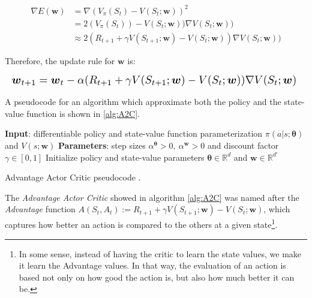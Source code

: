 \documentclass[twoside,twocolumn]{article}
\begin{document}
\begin{equation*}
  \begin{split}
    \nabla E(\boldsymbol{w}) &= \nabla (V_{\pi}(S_t) - V(S_t;\boldsymbol{w}))^2 \\
    &= 2(V_{\pi}(S_t)) - V(S_t;\boldsymbol{w})) \nabla V(S_t;\boldsymbol{w})) \\
    &\approx 2(R_{t+1} + \gamma V(S_{t+1};\boldsymbol{w}) - V(S_t;\boldsymbol{w})) \nabla V(S_t;\boldsymbol{w}))
  \end{split}
\end{equation*}

Therefore, the update rule for $\boldsymbol{w}$ is:

\begin{equation*}
  \resizebox{1\linewidth}{!}{%
  $
    \boldsymbol{w}_{t+1} = \boldsymbol{w}_t - \alpha (R_{t+1} + \gamma V(S_{t+1}; \boldsymbol{w}) - V(S_{t}; \boldsymbol{w})) \nabla V(S_{t}; \boldsymbol{w})
    $
  }
\end{equation*}

A pseudocode for an algorithm which approximate both the policy and the state-value function is shown in \ref{alg:A2C}.

\begin{algorithm}[h]
 \textbf{Input}: differentiable policy and state-value function parameterization $\pi(a|s;\boldsymbol{\theta})$ and $V(s;\boldsymbol{w})$\;
 \textbf{Parameters}: step sizes $\alpha^{\boldsymbol{\theta}}>0,\  \alpha^{\boldsymbol{w}}>0$ and discount factor $\gamma \in [0,1]$\;
 Initialize policy and state-value parameters $\boldsymbol{\theta}\in\mathbb{R}^d$ and $\boldsymbol{w}\in\mathbb{R}^{d'}$\;
 \caption{Advantage Actor Critic pseudocode \cite{Sutton1998}.}
 \label{alg:A2C}
\end{algorithm}

The \emph{Advantage Actor Critic} showed in algorithm \ref{alg:A2C} was named after the \emph{Advantage} function $A(S_t, A_t):=R_{t+1} + \gamma V(S_{t+1};\boldsymbol{w}) - V(S_{t};\boldsymbol{w})$, which captures how better an action is compared to the others at a given state\footnote{In some sense, instead of having the critic to learn the state values, we make it learn the Advantage values. In that way, the evaluation of an action is based not only on how good the action is, but also how much better it can be.}.
\end{document}
